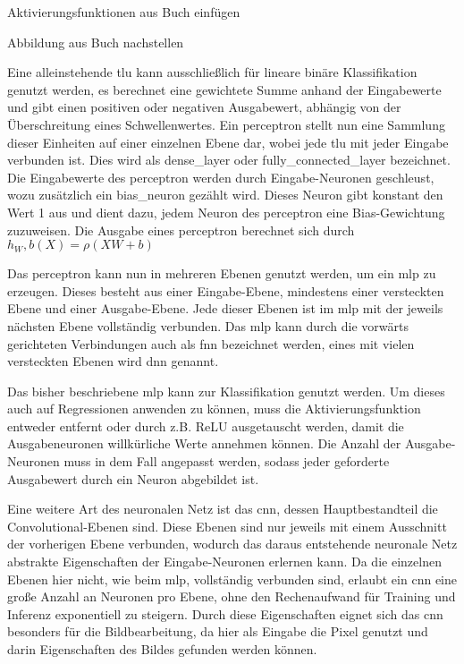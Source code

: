 Aktivierungsfunktionen aus Buch einfügen

Abbildung aus Buch nachstellen

Eine alleinstehende \gls{tlu} kann ausschließlich für lineare binäre Klassifikation genutzt werden, es berechnet eine gewichtete Summe anhand der Eingabewerte und gibt einen positiven oder negativen Ausgabewert, abhängig von der Überschreitung eines Schwellenwertes. Ein \gls{perceptron} stellt nun eine Sammlung dieser Einheiten auf einer einzelnen Ebene dar, wobei jede \gls{tlu} mit jeder Eingabe verbunden ist. Dies wird als \gls{dense_layer} oder \gls{fully_connected_layer} bezeichnet. Die Eingabewerte des \gls{perceptron} werden durch Eingabe-Neuronen geschleust, wozu zusätzlich ein \gls{bias_neuron} gezählt wird. Dieses Neuron gibt konstant den Wert 1 aus und dient dazu, jedem Neuron des \gls{perceptron} eine Bias-Gewichtung zuzuweisen. Die Ausgabe eines \gls{perceptron} berechnet sich durch \(h_W,b(X)=\rho(XW+b)\) \cite[vgl. S. 284 ff.]{Geron2019}

Das \gls{perceptron} kann nun in mehreren Ebenen genutzt werden, um ein \gls{mlp} zu erzeugen. Dieses besteht aus einer Eingabe-Ebene, mindestens einer versteckten Ebene und einer Ausgabe-Ebene. Jede dieser Ebenen ist im \gls{mlp} mit der jeweils nächsten Ebene vollständig verbunden. Das \gls{mlp} kann durch die vorwärts gerichteten Verbindungen auch als \gls{fnn} bezeichnet werden, eines mit vielen versteckten Ebenen wird \gls{dnn} genannt. \cite[vgl. S. 284 ff.]{Geron2019}

Das bisher beschriebene \gls{mlp} kann zur Klassifikation genutzt werden. Um dieses auch auf Regressionen anwenden zu können, muss die Aktivierungsfunktion entweder entfernt oder durch z.B. ReLU ausgetauscht werden, damit die Ausgabeneuronen willkürliche Werte annehmen können. Die Anzahl der Ausgabe-Neuronen muss in dem Fall angepasst werden, sodass jeder geforderte Ausgabewert durch ein Neuron abgebildet ist. \cite[vgl. S. 292 ff.]{Geron2019}

Eine weitere Art des neuronalen Netz ist das \gls{cnn}, dessen Hauptbestandteil die Convolutional-Ebenen sind. Diese Ebenen sind nur jeweils mit einem Ausschnitt der vorherigen Ebene verbunden, wodurch das daraus entstehende neuronale Netz abstrakte Eigenschaften der Eingabe-Neuronen erlernen kann. Da die einzelnen Ebenen hier nicht, wie beim \gls{mlp}, vollständig verbunden sind, erlaubt ein \gls{cnn} eine große Anzahl an Neuronen pro Ebene, ohne den Rechenaufwand für Training und Inferenz exponentiell zu steigern. Durch diese Eigenschaften eignet sich das \gls{cnn} besonders für die Bildbearbeitung, da hier als Eingabe die Pixel genutzt und darin Eigenschaften des Bildes gefunden werden können. \cite[vgl. S. 447 f.]{Geron2019}

